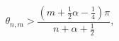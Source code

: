 \[\theta_{n,m}>\frac{\left(m+\tfrac{1}{2}\alpha-\tfrac{1}{4}\right){\pi}}{n+%
\alpha+\tfrac{1}{2}},\]